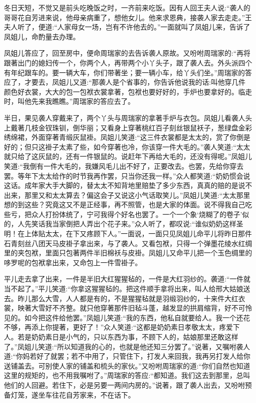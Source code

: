 \begin{parag}
    冬日天短，不觉又是前头吃晚饭之时，一齐前来吃饭。因有人回王夫人说:“袭人的哥哥花自芳进来说，他母亲病重了，想他女儿。他来求恩典，接袭人家去走走。”王夫人听了，便道:“人家母女一场，岂有不许他去的。”一面就叫了凤姐儿来，告诉了凤姐儿，命酌量去办理。
\end{parag}


\begin{parag}
    凤姐儿答应了，回至房中，便命周瑞家的去告诉袭人原故。又吩咐周瑞家的:“再将跟著出门的媳妇传一个，你两个人，再带两个小丫头子，跟了袭人去。外头派四个有年纪跟车的。要一辆大车，你们带著坐；要一辆小车，给丫头们坐。”周瑞家的答应了，才要去，凤姐儿又道:“那袭人是个省事的，你告诉他说我的话:叫他穿几件颜色好衣裳，大大的包一包袱衣裳拿著，包袱也要好好的，手炉也要拿好的。临走时，叫他先来我瞧瞧。”周瑞家的答应去了。
\end{parag}


\begin{parag}
    半日，果见袭人穿戴来了，两个丫头与周瑞家的拿著手炉与衣包。凤姐儿看袭人头上戴著几枝金钗珠钏，倒华丽；又看身上穿著桃红百子刻丝银鼠袄子，葱绿盘金彩绣绵裙，外面穿著青缎灰鼠褂。凤姐儿笑道:“这三件衣裳都是太太的，赏了你倒是好的；但只这褂子太素了些，如今穿著也冷，你该穿一件大毛的。”袭人笑道:“太太就只给了这灰鼠的，还有一件银鼠的。说赶年下再给大毛的，还没有得呢。”凤姐儿笑道:“我倒有一件大毛的，我嫌风毛儿出不好了，正要改去。也罢，先给你穿去罢。等年下太太给作的时节我再作罢，只当你还我一样。”众人都笑道:“奶奶惯会说这话。成年家大手大脚的，替太太不知背地里赔垫了多少东西，真真的赔的是说不出来，那里又和太太算去？偏这会子又说这小气话取笑儿。”凤姐儿笑道:“太太那里想的到这些？究竟这又不是正经事，再不照管，也是大家的体面。说不得我自己吃些亏，把众人打扮体统了，宁可我得个好名也罢了。一个一个象‘烧糊了的卷子’似的，人先笑话我当家倒把人弄出个花子来。”众人听了，都叹说:“谁似奶奶这样圣明！在上体贴太太，在下又疼顾下人。”一面说，一面只见凤姐儿命平儿将昨日那件石青刻丝八团天马皮褂子拿出来，与了袭人。又看包袱，只得一个弹墨花绫水红绸里的夹包袱，里面只包著两件半旧棉袄与皮褂。凤姐儿又命平儿把一个玉色绸里的哆罗呢的包袱拿出来，又命包上一件雪褂子。
\end{parag}


\begin{parag}
    平儿走去拿了出来，一件是半旧大红猩猩毡的，一件是大红羽纱的。袭道:“一件就当不起了。”平儿笑道:“你拿这猩猩毡的。把这件顺手拿将出来，叫人给邢大姑娘送去。昨儿那么大雪，人人都是有的，不是猩猩毡就是羽缎羽纱的，十来件大红衣裳，映著大雪好不齐整。就只他穿著那件旧毡斗蓬，越发显的拱肩缩背，好不可怜见的。如今把这件给他罢。”凤姐儿笑道:“我的东西，他私自就要给人。我一个还花不够，再添上你提著，更好了！”众人笑道:“这都是奶奶素日孝敬太太，疼爱下人。若是奶奶素日是小气的，只以东西为事，不顾下人的，姑娘那里还敢这样了。”凤姐儿笑道:“所以知道我的心的，也就是他还知三分罢了。”说著，又嘱咐袭人道:“你妈若好了就罢；若不中用了，只管住下，打发人来回我，我再另打发人给你送铺盖去。可别使人家的铺盖和梳头的家伙。”又吩咐周瑞家的道:“你们自然也知道这里的规矩的，也不用我嘱咐了。”周瑞家的答应:“都知道。我们这去到那里，总叫他们的人回避。若住下，必是另要一两间内房的。”说著，跟了袭人出去，又吩咐预备灯笼，遂坐车往花自芳家来，不在话下。
\end{parag}



